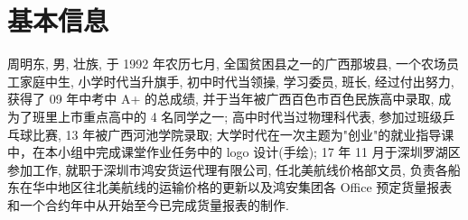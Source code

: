 \chapter{基本信息}
周明东, 男, 壮族, 于 1992 年农历七月, 全国贫困县之一的广西那坡县, 一个农场员工家庭中生, 小学时代当升旗手, 初中时代当领操, 学习委员, 班长, 经过付出努力, 获得了 09 年中考中 A+ 的总成绩, 并于当年被广西百色市百色民族高中录取, 成为了班里上市重点高中的 4 名同学之一; 高中时代当过物理科代表, 参加过班级乒乓球比赛, 13 年被广西河池学院录取; 大学时代在一次主题为"创业"的就业指导课中，在本小组中完成课堂作业任务中的 logo 设计(手绘); 17 年 11 月于深圳罗湖区参加工作, 就职于深圳市鸿安货运代理有限公司, 任北美航线价格部文员, 负责各船东在华中地区往北美航线的运输价格的更新以及鸿安集团各 Office 预定货量报表和一个合约年中从开始至今已完成货量报表的制作. 
